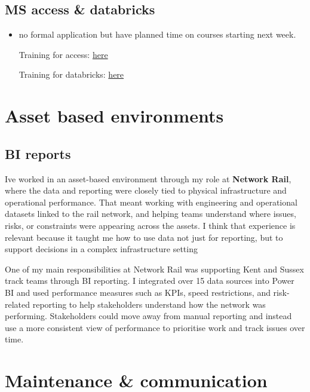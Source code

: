 \documentclass[
  letterpaper,
]{scrbook}
\begin{document}
\subsection{MS access \& databricks}\label{ms-access-databricks}

\begin{itemize}
\item
  no formal application but have planned time on courses starting next
  week.

  Training for access:
  \href{https://support.microsoft.com/en-us/office/access-video-training-a5ffb1ef-4cc4-4d79-a862-e2dda6ef38e6}{here}

  Training for databricks:
  \href{https://learn.microsoft.com/en-us/training/paths/data-engineer-azure-databricks/}{here}
\end{itemize}

\section{Asset based environments}\label{asset-based-environments}

\subsection{BI reports}\label{bi-reports}

I\textquotesingle ve worked in an asset-based environment through my
role at \textbf{Network Rail}, where the data and reporting were closely
tied to physical infrastructure and operational performance. That meant
working with engineering and operational datasets linked to the rail
network, and helping teams understand where issues, risks, or
constraints were appearing across the assets. I think that experience is
relevant because it taught me how to use data not just for reporting,
but to support decisions in a complex infrastructure setting

One of my main responsibilities at Network Rail was supporting Kent and
Sussex track teams through BI reporting. I integrated over 15 data
sources into Power BI and used performance measures such as KPIs, speed
restrictions, and risk-related reporting to help stakeholders understand
how the network was performing. Stakeholders could move away from manual
reporting and instead use a more consistent view of performance to
prioritise work and track issues over time.

\section{Maintenance \& communication}\label{maintenance-communication}
\end{document}
